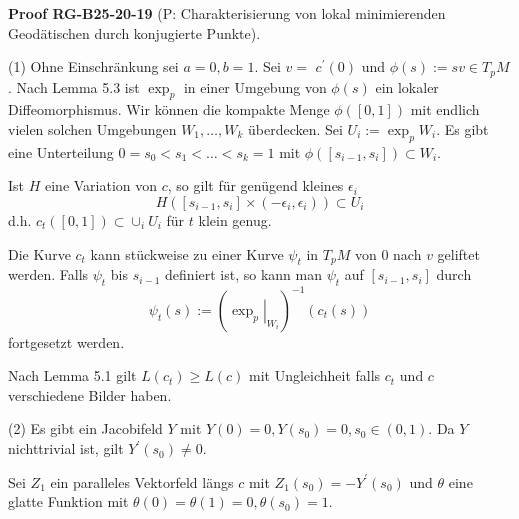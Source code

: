 \documentclass[10pt, letterpaper]{article}
\newcommand{\CustomHeading}[3]{%
  \par\medskip\noindent%
  \textbf{#1 #2} \textnormal{(#3)}.\enskip%
}
\newenvironment{PROOF}[2]{\begin{unitbox}\CustomHeading{Proof}{#1}{#2}}{\end{unitbox}}
\begin{document}
\begin{PROOF}{RG-B25-20-19}{P: Charakterisierung von lokal minimierenden Geodätischen durch konjugierte Punkte}
(1) Ohne Einschränkung sei $a=0, b=1$. Sei $v=$ $c^{\prime}(0)$ und $\phi(s):=s v \in T_{p} M$. Nach Lemma 5.3 ist $\exp _{p}$ in einer Umgebung von $\phi(s)$ ein lokaler Diffeomorphismus. Wir können die kompakte Menge $\phi([0,1])$ mit endlich vielen solchen Umgebungen $W_{1}, \ldots, W_{k}$ überdecken. Sei $U_{i}:=\exp _{p} W_{i}$. Es gibt eine Unterteilung $0=s_{0}<s_{1}<\ldots<s_{k}=1$ mit $\phi\left(\left[s_{i-1}, s_{i}\right]\right) \subset W_{i}$.

Ist $H$ eine Variation von $c$, so gilt für genügend kleines $\epsilon_{i}$
$$
H\left(\left[s_{i-1}, s_{i}\right] \times\left(-\epsilon_{i}, \epsilon_{i}\right)\right) \subset U_{i}
$$
d.h. $c_{t}([0,1]) \subset \cup_{i} U_{i}$ für $t$ klein genug.

Die Kurve $c_{t}$ kann stückweise zu einer Kurve $\psi_{t}$ in $T_{p} M$ von 0 nach $v$ geliftet werden. Falls $\psi_{t}$ bis $s_{i-1}$ definiert ist, so kann man $\psi_{t}$ auf $\left[s_{i-1}, s_{i}\right]$ durch
$$
\psi_{t}(s):=\left(\left.\exp _{p}\right|_{W_{i}}\right)^{-1}\left(c_{t}(s)\right)
$$
fortgesetzt werden.

Nach Lemma 5.1 gilt $L\left(c_{t}\right) \geq L(c)$ mit Ungleichheit falls $c_{t}$ und $c$ verschiedene Bilder haben.


(2) Es gibt ein Jacobifeld $Y$ mit $Y(0)=0, Y\left(s_{0}\right)=0, s_{0} \in(0,1)$. Da $Y$ nichttrivial ist, gilt $Y^{\prime}\left(s_{0}\right) \neq 0$.

Sei $Z_{1}$ ein paralleles Vektorfeld längs $c$ mit $Z_{1}\left(s_{0}\right)=-Y^{\prime}\left(s_{0}\right)$ und $\theta$ eine glatte Funktion mit $\theta(0)=\theta(1)=0, \theta\left(s_{0}\right)=1$.


\end{PROOF}
\end{document}
